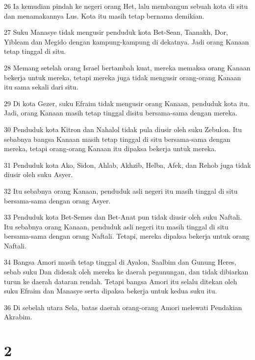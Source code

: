 \par 26 Ia kemudian pindah ke negeri orang Het, lalu membangun sebuah kota di situ dan menamakannya Lus. Kota itu masih tetap bernama demikian.
\par 27 Suku Manasye tidak mengusir penduduk kota Bet-Sean, Taanakh, Dor, Yibleam dan Megido dengan kampung-kampung di dekatnya. Jadi orang Kanaan tetap tinggal di situ.
\par 28 Memang setelah orang Israel bertambah kuat, mereka memaksa orang Kanaan bekerja untuk mereka, tetapi mereka juga tidak mengusir orang-orang Kanaan itu sama sekali dari situ.
\par 29 Di kota Gezer, suku Efraim tidak mengusir orang Kanaan, penduduk kota itu. Jadi, orang Kanaan masih tetap tinggal disitu bersama-sama dengan mereka.
\par 30 Penduduk kota Kitron dan Nahalol tidak pula diusir oleh suku Zebulon. Itu sebabnya bangsa Kanaan masih tetap tinggal di situ bersama-sama dengan mereka, tetapi orang-orang Kanaan itu dipaksa bekerja untuk mereka.
\par 31 Penduduk kota Ako, Sidon, Ahlab, Akhzib, Helba, Afek, dan Rehob juga tidak diusir oleh suku Asyer.
\par 32 Itu sebabnya orang Kanaan, penduduk asli negeri itu masih tinggal di situ bersama-sama dengan orang Asyer.
\par 33 Penduduk kota Bet-Semes dan Bet-Anat pun tidak diusir oleh suku Naftali. Itu sebabnya orang Kanaan, penduduk asli negeri itu masih tinggal di situ bersama-sama dengan orang Naftali. Tetapi, mereka dipaksa bekerja untuk orang Naftali.
\par 34 Bangsa Amori masih tetap tinggal di Ayalon, Saalbim dan Gunung Heres, sebab suku Dan didesak oleh mereka ke daerah pegunungan, dan tidak dibiarkan turun ke daerah dataran rendah. Tetapi bangsa Amori itu selalu ditekan oleh suku Efraim dan Manasye serta dipaksa bekerja untuk kedua suku itu.
\par 36 Di sebelah utara Sela, batas daerah orang-orang Amori melewati Pendakian Akrabim.

\chapter{2}

